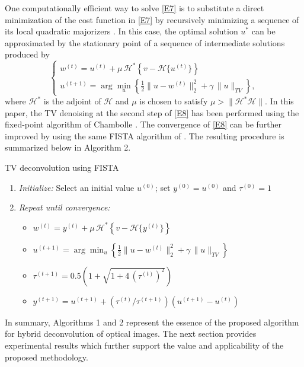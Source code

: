 \pdfoutput=1 \documentclass[journal]{IEEEtran}
\begin{document}
One computationally efficient way to solve \eqref{E7} is to substitute a direct minimization of the cost function in \eqref{E7} by recursively minimizing a sequence of its local quadratic majorizers \cite{33}. In this case, the optimal solution $u^\ast$ can be approximated by the stationary point of a sequence of intermediate solutions produced by
\begin{equation} \label{E8}
\begin{cases}
w^{(t)} = u^{(t)} + \mu \, \mathcal{H}^\ast \left\{ v - \mathcal{H}\{u^{(t)}\}  \right\} \\
u^{(t+1)} = \arg \min_u \left\{ \frac{1}{2} \| u - w^{(t)} \|_2^2 + \gamma \, \| u \|_{TV} \right\},
\end{cases}
\end{equation}
where $\mathcal{H}^\ast$ is the adjoint of $\mathcal{H}$ and $\mu$ is chosen to satisfy $\mu > \| \mathcal{H}^\ast \mathcal{H} \|$. In this paper, the TV denoising at the second step of \eqref{E8} has been performed using the fixed-point algorithm of Chambolle \cite{11}. The convergence of \eqref{E8} can be further improved by using the same FISTA algorithm of \cite{33}. The resulting procedure is summarized below in Algorithm 2.

\begin{algorithm}
\setlength{\leftmargini}{0pt}
\caption{TV deconvolution using FISTA}
\begin{enumerate}
\item {\it Initialize:} Select an initial value $u^{(0)}$; set $y^{(0)} = u^{(0)}$ and $\tau^{(0)}=1$\\
\item {\it Repeat until convergence:}
\begin{itemize}
\item $w^{(t)} = y^{(t)} + \mu \, \mathcal{H}^\ast \left\{ v - \mathcal{H}\{y^{(t)}\}  \right\}$
\item $u^{(t+1)} = \arg \min_u \left\{ \frac{1}{2} \| u - w^{(t)} \|_2^2 + \gamma \, \| u \|_{TV} \right\}$
\item $\tau^{(t+1)} = 0.5  \left( 1+\sqrt{1+ 4 \, (\tau^{(t)})^2} \right)$
\item $y^{(t+1)} = u^{(t+1)} + (\tau^{(t)}/\tau^{(t+1)}) (u^{(t+1)} - u^{(t)})$
\end{itemize}
\end{enumerate}
\label{algo2}
\end{algorithm}

In summary, Algorithms 1 and 2 represent the essence of the proposed algorithm for hybrid deconvolution of optical images. The next section provides experimental results which further support the value and applicability of the proposed methodology.
\end{document}

